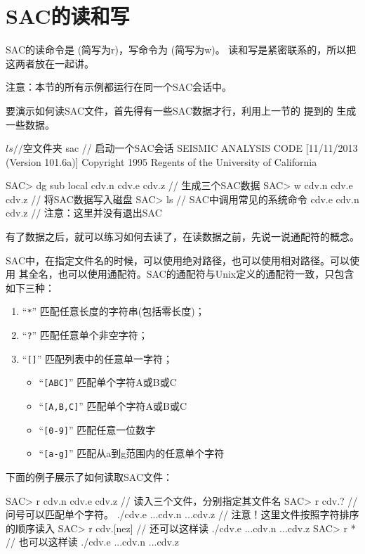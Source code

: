 \section{SAC的读和写}
\label{sec:read-and-write}
SAC的读命令是  (简写为r)，写命令为  (简写为w)。
读和写是紧密联系的，所以把这两者放在一起讲。

注意：本节的所有示例都运行在同一个SAC会话中。

要演示如何读SAC文件，首先得有一些SAC数据才行，利用上一节的
提到的  生成一些数据。
\begin{SACCode}
$ ls                // 空文件夹
$ sac               // 启动一个SAC会话
 SEISMIC ANALYSIS CODE [11/11/2013 (Version 101.6a)]
 Copyright 1995 Regents of the University of California

SAC> dg sub local cdv.n cdv.e cdv.z     // 生成三个SAC数据
SAC> w cdv.n cdv.e cdv.z                // 将SAC数据写入磁盘
SAC> ls                                 // SAC中调用常见的系统命令
cdv.e  cdv.n  cdv.z
                                        // 注意：这里并没有退出SAC
\end{SACCode}

有了数据之后，就可以练习如何去读了，在读数据之前，先说一说通配符的概念。

SAC中，在指定文件名的时候，可以使用绝对路径，也可以使用相对路径。可以使用
其全名，也可以使用通配符。SAC的通配符与Unix定义的通配符一致，只包含如下三种：
\begin{enumerate}
\item ``\texttt{*}'' 匹配任意长度的字符串(包括零长度)；
\item ``\texttt{?}'' 匹配任意单个非空字符；
\item ``\texttt{[]}'' 匹配列表中的任意单一字符；
    \begin{itemize}
        \item ``\texttt{[ABC]}'' 匹配单个字符A或B或C
        \item ``\texttt{[A,B,C]}'' 匹配单个字符A或B或C
        \item ``\texttt{[0-9]}'' 匹配任意一位数字
        \item ``\texttt{[a-g]}'' 匹配从a到g范围内的任意单个字符
    \end{itemize}
\end{enumerate}

下面的例子展示了如何读取SAC文件：
\begin{SACCode}
SAC> r cdv.n cdv.e cdv.z    // 读入三个文件，分别指定其文件名
SAC> r cdv.?                // 问号可以匹配单个字符。
./cdv.e ...cdv.n ...cdv.z   // 注意！这里文件按照字符排序的顺序读入
SAC> r cdv.[nez]            // 还可以这样读
./cdv.e ...cdv.n ...cdv.z
SAC> r *                    // 也可以这样读
./cdv.e ...cdv.n ...cdv.z
\end{SACCode}

